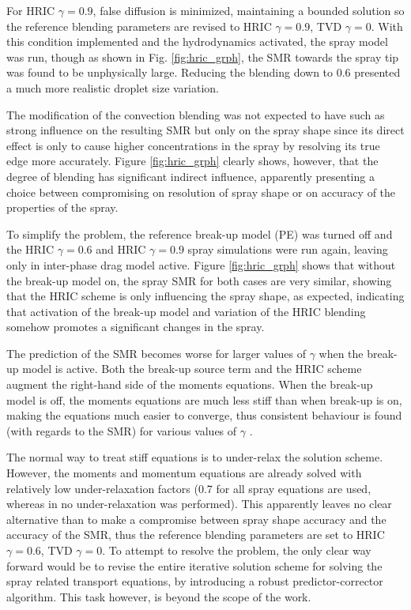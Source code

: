 \documentclass[a4paper,10pt]{article}
\begin{document}
For HRIC $\gamma=0.9$, false diffusion is minimized, maintaining a bounded solution so the reference blending parameters are revised to HRIC $\gamma=0.9$, TVD $\gamma=0$. With this condition implemented and the hydrodynamics activated, the spray model was run, though as shown in Fig. \ref{fig:hric_grph}, the SMR towards the spray tip was found to be unphysically large. Reducing the blending down to 0.6 presented a much more realistic droplet size variation.

The modification of the convection blending was not expected to have such as strong influence on the resulting SMR but only on the spray shape since its direct effect is only to cause higher concentrations in the spray by resolving its true edge more accurately. Figure \ref{fig:hric_grph} clearly shows, however, that the degree of blending has significant indirect influence, apparently presenting a choice between compromising on resolution of spray shape or on accuracy of the properties of the spray.

To simplify the problem, the reference break-up model (PE) was turned off and the HRIC $\gamma=0.6$ and HRIC $\gamma=0.9$ spray simulations were run again, leaving only in inter-phase drag model active. Figure \ref{fig:hric_grph} shows that without the break-up model on, the spray SMR for both cases are very similar, showing that the HRIC scheme is only influencing the spray shape, as expected, indicating that activation of the break-up model and variation of the HRIC blending somehow promotes a significant changes in the spray.

The prediction of the SMR becomes worse for larger values of $\gamma$ when the break-up model is active. Both the break-up source term and the HRIC scheme augment the right-hand side of the moments equations. When the break-up model is off, the moments equations are much less stiff than when break-up is on, making the equations much easier to converge, thus consistent behaviour is found (with regards to the SMR) for various values of $\gamma$ .

The normal way to treat stiff equations is to under-relax the solution scheme. However, the moments and momentum equations are already solved with relatively low under-relaxation factors (0.7 for all spray equations are used, whereas in \cite{beck2000} no  under-relaxation was performed). This apparently leaves no clear alternative than to make a compromise between spray shape accuracy and the accuracy of the SMR, thus the reference blending parameters are set to HRIC $\gamma=0.6$, TVD $\gamma=0$. To attempt to resolve the problem, the only clear way forward would be to revise the entire iterative solution scheme for solving the spray related transport equations, by introducing a robust predictor-corrector algorithm. This task however, is beyond the scope of the work.
\end{document}

